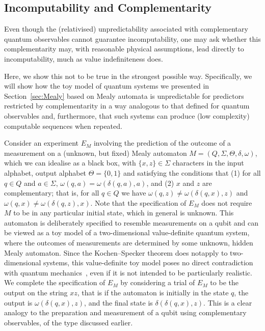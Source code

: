\documentclass[information,article,accept,moreauthors,pdftex,12pt,a4paper]{mdpi}
\theoremstyle{mdpi}
\newcounter{ex}
\newcounter{re}
\theoremstyle{mdpidefinition}
\begin{document}
\subsection{Incomputability and Complementarity}
\label{sec:ic}

Even though the (relativised) unpredictability associated with complementary quantum observables cannot guarantee incomputability, one may ask whether this complementarity may, with reasonable physical assumptions, lead directly to incomputability, much as value indefiniteness does.

Here, we show this not to be true in the strongest possible way.
Specifically, we will show how the toy model of quantum systems we presented in Section~\ref{sec:Mealy} based on Mealy automata is unpredictable for predictors restricted by complementarity in a way analogous to that defined for quantum observables and, furthermore, that such systems can produce (low complexity) computable sequences when repeated.

Consider an experiment $E_M$ involving the prediction of the outcome of a measurement on a (unknown, but fixed) Mealy automaton $M=(Q,\Sigma,\Theta,\delta,\omega)$, which we can idealise as a black box, with $\{x,z\}\in \Sigma$ characters in the input alphabet, output alphabet $\Theta=\{0,1\}$ and satisfying the conditions that
(1) for all $q\in Q$ and $a\in\Sigma$, $\omega(q,a)=\omega(\delta(q,a),a)$,
and (2) $x$ and $z$ are complementary;
that is, for all $q\in Q$ we have $\omega(q,z)\neq \omega(\delta(q,x),z)$ and $\omega(q,x)\neq \omega(\delta(q,z),x)$.
Note that the specification of $E_M$ does not require $M$ to be in any particular initial state, which in general is unknown.
This automaton is deliberately specified to resemble measurements on a qubit and can be viewed as a toy model of a two-dimensional value-definite quantum system, where the outcomes of measurements are determined by some unknown, hidden Mealy automaton.
Since the Kochen--Specker theorem does not\linebreak apply to two-dimensional systems, this value-definite toy model poses no direct contradiction with quantum mechanics~\cite{kochen1}, even if it is not intended to be particularly realistic.
We complete the specification of $E_M$ by considering a trial of $E_M$ to be the output on the string $xz$, that is if the automaton is initially in the state $q$, the output is $\omega(\delta(q,x),z)$, and the final state is $\delta(\delta(q,x),z)$.
This is a clear analogy to the preparation and measurement of a qubit using complementary observables, of the type discussed earlier.
\end{document}
